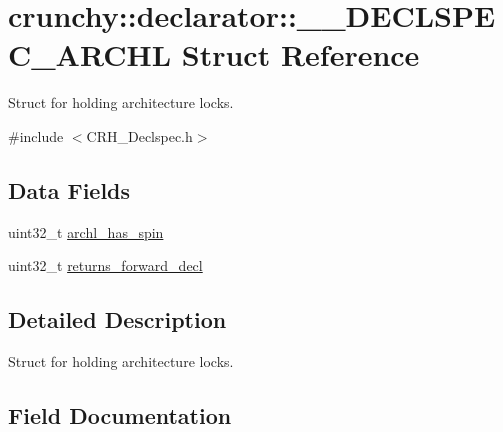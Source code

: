 \hypertarget{structcrunchy_1_1declarator_1_1_____d_e_c_l_s_p_e_c___a_r_c_h_l}{}\section{crunchy\+:\+:declarator\+:\+:\+\_\+\+\_\+\+D\+E\+C\+L\+S\+P\+E\+C\+\_\+\+A\+R\+C\+H\+L Struct Reference}
\label{structcrunchy_1_1declarator_1_1_____d_e_c_l_s_p_e_c___a_r_c_h_l}


Struct for holding architecture locks.  




{\ttfamily \#include $<$C\+R\+H\+\_\+\+Declspec.\+h$>$}

\subsection*{Data Fields}
\begin{DoxyCompactItemize}
\item 
uint32\+\_\+t \hyperlink{structcrunchy_1_1declarator_1_1_____d_e_c_l_s_p_e_c___a_r_c_h_l_aadc3174237edfc7511f0b8bd94fde0ba}{archl\+\_\+has\+\_\+spin}
\item 
uint32\+\_\+t \hyperlink{structcrunchy_1_1declarator_1_1_____d_e_c_l_s_p_e_c___a_r_c_h_l_a73a2d868629fed82ad40089b1a7066d4}{returns\+\_\+forward\+\_\+decl}
\end{DoxyCompactItemize}


\subsection{Detailed Description}
Struct for holding architecture locks. 

\subsection{Field Documentation}
\hypertarget{structcrunchy_1_1declarator_1_1_____d_e_c_l_s_p_e_c___a_r_c_h_l_aadc3174237edfc7511f0b8bd94fde0ba}{}
